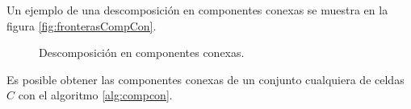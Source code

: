 Un ejemplo de una descomposición en componentes conexas se muestra en la figura \ref{fig:fronterasCompCon}.

\begin{figure}[H]
  \centering
  \qquad

  \caption{Descomposición en componentes conexas.}\label{fig:descCompCon}
\end{figure}

Es posible obtener las componentes conexas de un conjunto cualquiera de
celdas $C$ con el algoritmo \ref{alg:compcon}.

